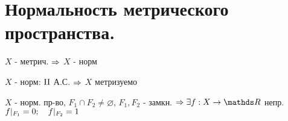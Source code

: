 \documentclass[geometry.tex]{subfiles}
\begin{document}
  \section{Нормальность метрического пространства.}


  \begin{theorem}
      $X$ - метрич. $\Rightarrow$ $X$ - норм
  \end{theorem}

  \begin{theorem}[б/д]
      $X$ - норм: $\RNumb{2}$ А.С. $\Rightarrow$ $X$ метризуемо
  \end{theorem}

  \begin{llemma}[Урысона]
      $X$ - норм. пр-во, $F_1 \cap F_2 \neq \varnothing$, $F_1, F_2$ - замкн. $\Ra \e f: X \ra \R$ непр. $f|_{F_1} = 0;\quad f|_{F_2} = 1$
  \end{llemma}
\end{document}
